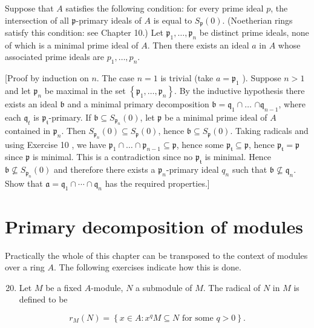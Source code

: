 \documentclass{standalone}
\theoremstyle{definition}
\theoremstyle{remark}
\begin{document}
Suppose that $A$ satisfies the following condition: for every prime ideal $p$,
the intersection of all $\mathfrak{p}$-primary ideals of $A$ is equal to
$S_{\mathfrak{p}}(0)$. (Noetherian rings satisfy this condition: see Chapter
10.) Let $\mathfrak{p}_{1}, \ldots, \mathfrak{p}_{n}$ be distinct prime ideals,
none of which is a minimal prime ideal of $A$. Then there exists an ideal $a$ in
$A$ whose associated prime ideals are $p_{1}, \ldots, p_{n}$.

[Proof by induction on $n$. The case $n=1$ is trivial (take $a=\mathfrak{p}_{1}$
). Suppose $n>1$ and let $\mathfrak{p}_{n}$ be maximal in the set
$\left\{\mathfrak{p}_{1}, \ldots, \mathfrak{p}_{n}\right\}$. By the inductive
hypothesis there exists an ideal $\mathfrak{b}$ and a minimal primary
decomposition $\mathfrak{b}=\mathfrak{q}_{1} \cap \ldots$ $\cap
\mathfrak{q}_{n-1}$, where each $\mathfrak{q}_{t}$ is
$\mathfrak{p}_{\mathfrak{t}}$-primary. If $\mathfrak{b} \subseteq
S_{\mathfrak{p}_{n}}(0)$, let $\mathfrak{p}$ be a minimal prime ideal of $A$
contained in $\mathfrak{p}_{n}$. Then $S_{\mathfrak{p}_{n}}(0) \subseteq
S_{\mathfrak{p}}(0)$, hence $\mathfrak{b} \subseteq S_{\mathfrak{p}}(0)$. Taking
radicals and using Exercise 10 , we have $\mathfrak{p}_{1} \cap \ldots \cap
\mathfrak{p}_{n-1} \subseteq \mathfrak{p}$, hence some
$\mathfrak{p}_{\mathfrak{t}} \subseteq \mathfrak{p}$, hence
$\mathfrak{p}_{\mathfrak{t}}=\mathfrak{p}$ since $\mathfrak{p}$ is minimal. This
is a contradiction since no $\mathfrak{p}_{\mathfrak{t}}$ is minimal. Hence
$\mathfrak{b} \nsubseteq S_{\mathfrak{p}_{n}}(0)$ and therefore there exists a
$\mathfrak{p}_{n}$-primary ideal $q_{n}$ such that $\mathfrak{b} \nsubseteq
\mathfrak{q}_{n}$. Show that $\mathfrak{a}=\mathfrak{q}_{1} \cap \cdots \cap
\mathfrak{q}_{n}$ has the required properties.]

\section{Primary decomposition of modules}
Practically the whole of this chapter can be transposed to the context of
modules over a ring $A$. The following exercises indicate how this is done.

\begin{enumerate}
  \setcounter{enumi}{19}
  \item Let $M$ be a fixed $A$-module, $N$ a submodule of $M$. The radical of
  $N$ in $M$ is defined to be
\end{enumerate}

\[
r_{M}(N)=\left\{x \in A: x^{q} M \subseteq N \text { for some } q>0\right\} .
\]
\end{document}
